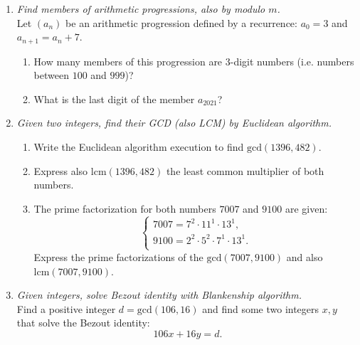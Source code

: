\documentclass[a4paper,12pt]{article}
\begin{document}
\begin{enumerate}
\item {\small \em
Find members of arithmetic progressions, also by modulo $m$.}\\
Let $(a_n)$ be an arithmetic progression defined by a recurrence:
$a_0 = 3$ and $a_{n+1} = a_n + 7$. 
\begin{enumerate}
\item How many members of this progression are $3$-digit numbers
(i.e. numbers between $100$ and $999$)? 
\item 
What is the last digit of the member $a_{2021}$?
\end{enumerate}

\item {\small \em
Given two integers, find their GCD (also LCM) by Euclidean algorithm.}\\
\begin{enumerate}
\item
Write the Euclidean algorithm execution to find $\text{gcd}(1396,482)$. 
\item 
Express also $\text{lcm}(1396,482)$ \textendash{} the least common multiplier
of both numbers.
\item 
The prime factorization for both numbers $7007$ and $9100$ are given: 
\[ \left\{  \begin{array}{l}
7007 = 7^2 \cdot 11^1 \cdot 13^1,\\
9100 = 2^2 \cdot 5^2 \cdot 7^1 \cdot 13^1.\\
\end{array} \right. \]
Express the prime factorizations of the $\text{gcd}(7007,9100)$
and also  $\text{lcm}(7007,9100)$. 
\end{enumerate}

\item {\small \em
Given integers, solve Bezout identity with Blankenship algorithm.}\\
Find a positive integer $d = \text{gcd}(106,16)$ and find some two integers $x,y$ that solve 
the Bezout identity:
\[ 106x + 16y = d. \]




\end{enumerate}
\end{document}

